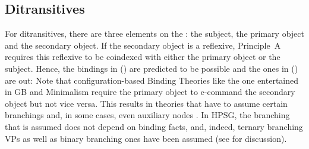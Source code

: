 \documentclass[output=paper,biblatex,babelshorthands,newtxmath,draftmode,colorlinks,citecolor=brown]{langscibook}
\begin{document}
\subsection{Ditransitives}

For ditransitives, there are three elements on the \argstl: the subject, the primary object and the
secondary object. If the secondary object is a reflexive, Principle~A requires this reflexive to be
coindexed with either the primary object or the subject. Hence, the bindings in () are
predicted to be possible and the ones in () are out:
\eal
{}
\zl
\eal
{}
\zl
Note that configuration-based Binding Theories like the one entertained in GB and Minimalism require
the primary object to c-command the secondary object but not vice versa. This results in theories
that have to assume certain branchings and, in some cases, even auxiliary nodes
\citep[Section~4.4]{Adger2003a}. In HPSG, the branching that is assumed does not depend on binding
facts, and, indeed, ternary branching VPs \citep[]{ps2} as well as binary branching ones have been assumed (see
 for discussion).
\end{document}
